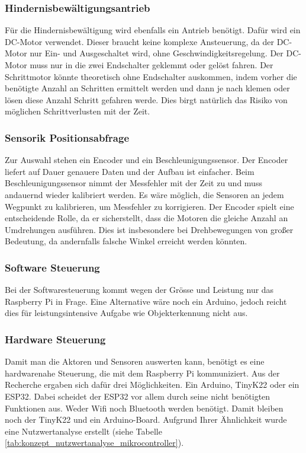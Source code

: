 \documentclass[../main.tex]{subfiles}
\begin{document}
\subsubsection{Hindernisbewältigungsantrieb}
\label{a3:Hindernisbewältigungsantrieb}
Für die Hindernisbewältigung wird ebenfalls ein Antrieb benötigt. Dafür wird ein DC-Motor verwendet. Dieser braucht keine komplexe Ansteuerung, da der DC-Motor nur Ein- und Ausgeschaltet wird, ohne Geschwindigkeitsregelung. Der DC-Motor muss nur in die zwei Endschalter geklemmt oder gelöst fahren. Der Schrittmotor könnte theoretisch ohne Endschalter auskommen, indem vorher die benötigte Anzahl an Schritten ermittelt werden und dann je nach klemen oder lösen diese Anzahl Schritt gefahren werde. Dies birgt natürlich das Risiko von möglichen Schrittverlusten mit der Zeit.

  
\subsubsection{Sensorik Positionsabfrage}
\label{a3:Sensorik:Positionsabfrage}
Zur Auswahl stehen ein Encoder und ein Beschleunigungssensor. Der Encoder liefert auf Dauer genauere Daten und der Aufbau ist einfacher. Beim Beschleunigungssensor nimmt der Messfehler mit der Zeit zu und muss andauernd wieder kalibriert werden. Es wäre möglich, die Sensoren an jedem Wegpunkt zu kalibrieren, um Messfehler zu korrigieren. Der Encoder spielt eine entscheidende Rolle, da er sicherstellt, dass die Motoren die gleiche Anzahl an Umdrehungen ausführen. Dies ist insbesondere bei Drehbewegungen von großer Bedeutung, da andernfalls falsche Winkel erreicht werden könnten.

\subsubsection{Software Steuerung}
Bei der Softwaresteuerung kommt wegen der Grösse und Leistung nur das Raspberry Pi in Frage.
Eine Alternative wäre noch ein Arduino, jedoch reicht dies für leistungsintensive Aufgabe wie
Objekterkennung nicht aus.

\newpage

\subsubsection{Hardware Steuerung}
\label{a3:Hardware Steuerung}
Damit man die Aktoren und Sensoren auswerten kann, benötigt es eine hardwarenahe Steuerung, die mit dem Raspberry Pi kommuniziert. Aus der Recherche ergaben sich dafür drei Möglichkeiten. Ein Arduino, TinyK22 oder ein ESP32. Dabei scheidet der ESP32 vor allem durch seine nicht benötigten Funktionen aus. Weder Wifi noch Bluetooth werden benötigt. Damit bleiben noch der TinyK22 und ein Arduino-Board. Aufgrund Ihrer Ähnlichkeit wurde eine Nutzwertanalyse erstellt (siehe Tabelle \ref{tab:konzept_nutzwertanalyse_mikrocontroller}).
\end{document}

